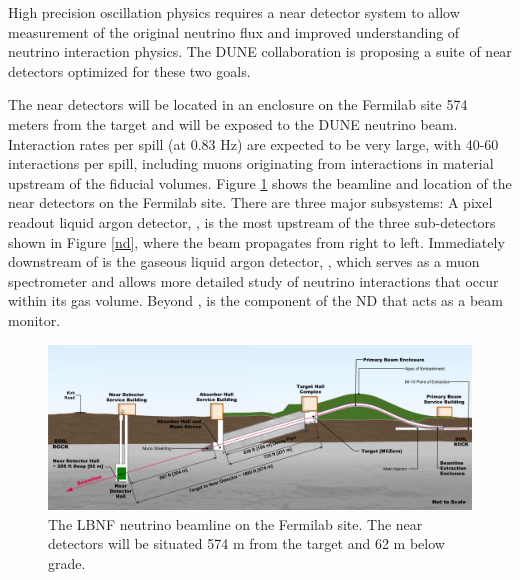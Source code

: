 High precision oscillation physics requires a near detector system to allow measurement of the original neutrino flux and improved understanding of neutrino interaction physics.  The DUNE  collaboration is proposing a suite of near detectors optimized for these two goals. 
 
 The near detectors will be located in an enclosure on the Fermilab site 574 meters from the target and will be exposed to the DUNE neutrino beam.    Interaction rates per spill (at 0.83 Hz) are expected to be very large, with 40-60 interactions per spill, including muons originating from interactions in material upstream of the fiducial volumes. Figure \ref{beamline} shows the beamline and location of the near detectors on the Fermilab site. There are three major subsystems:
 A pixel readout liquid argon detector, , is  the most upstream of the three sub-detectors shown in Figure \ref{nd}, where the beam propagates  from right to left. Immediately downstream of  is the gaseous liquid argon detector, , which serves  as  a muon spectrometer and allows more detailed study of neutrino interactions that occur within its gas volume. Beyond , is the  component of the ND that acts as a beam monitor. %
 
 \begin{figure}
     \centering
     \includegraphics[height=0.3\textwidth]{graphics/IntroFigures/beamline-sideview.png}
     \caption{The LBNF neutrino beamline on the Fermilab site. The near detectors will be situated 574 m from the target and 62 m below grade.}
     \label{beamline}
 \end{figure}
 

